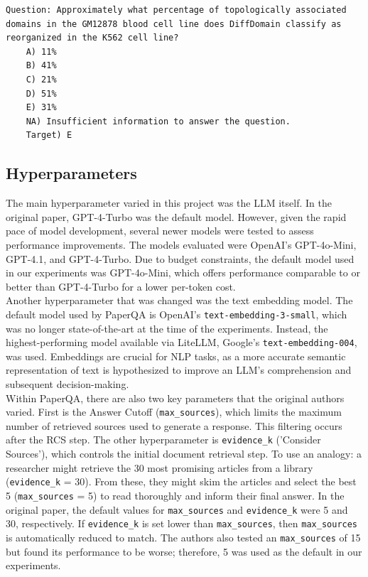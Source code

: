 \begin{verbatim}
Question: Approximately what percentage of topologically associated 
domains in the GM12878 blood cell line does DiffDomain classify as 
reorganized in the K562 cell line? 
    A) 11%
    B) 41%
    C) 21%
    D) 51%
    E) 31%
    NA) Insufficient information to answer the question.
    Target) E
\end{verbatim}



\subsection{Hyperparameters}

The main hyperparameter varied in this project was the LLM itself. In the original paper, GPT-4-Turbo was the default model. However, given the rapid pace of model development, several newer models were tested to assess performance improvements. The models evaluated were OpenAI's GPT-4o-Mini, GPT-4.1, and GPT-4-Turbo. Due to budget constraints, the default model used in our experiments was GPT-4o-Mini, which offers performance comparable to or better than GPT-4-Turbo for a lower per-token cost.\\

Another hyperparameter that was changed was the text embedding model. The default model used by PaperQA is OpenAI's \texttt{text-embedding-3-small}, which was no longer state-of-the-art at the time of the experiments. Instead, the highest-performing model available via LiteLLM, Google's \texttt{text-embedding-004}, was used. Embeddings are crucial for NLP tasks, as a more accurate semantic representation of text is hypothesized to improve an LLM's comprehension and subsequent decision-making. \\

Within PaperQA, there are also two key parameters that the original authors varied. First is the Answer Cutoff (\texttt{max\_sources}), which limits the maximum number of retrieved sources used to generate a response. This filtering occurs after the RCS step. The other hyperparameter is \texttt{evidence\_k} ('Consider Sources'), which controls the initial document retrieval step. To use an analogy: a researcher might retrieve the 30 most promising articles from a library (\texttt{evidence\_k} = 30). From these, they might skim the articles and select the best 5 (\texttt{max\_sources} = 5) to read thoroughly and inform their final answer. In the original paper, the default values for \texttt{max\_sources} and \texttt{evidence\_k} were 5 and 30, respectively. If \texttt{evidence\_k} is set lower than \texttt{max\_sources}, then \texttt{max\_sources} is automatically reduced to match. The authors also tested an \texttt{max\_sources} of 15 but found its performance to be worse; therefore, 5 was used as the default in our experiments.\\

